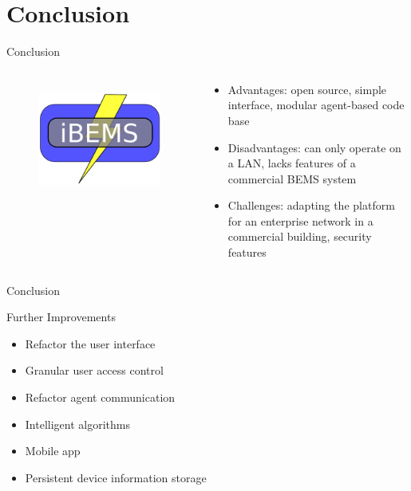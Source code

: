 \documentclass{beamer}
\begin{document}
\section{Conclusion}
\begin{frame}{Conclusion}{} %
  \begin{columns}
    \begin{figure}
      \centering
      \includegraphics[scale=0.8]{figs/logo.pdf}
      \label{fig:logo}
    \end{figure}
    \begin{block}{}
      \begin{itemize}
      \item Advantages: open source, simple interface, modular agent-based code base
      \item Disadvantages: can only operate on a LAN, lacks features of a commercial BEMS system
      \item Challenges: adapting the platform for an enterprise network in a commercial building, security features 
    \end{itemize}
    \end{block}
  \end{columns}  
\end{frame}

\begin{frame}{Conclusion}{}
  \begin{block}{Further Improvements}
    \begin{itemize}
    \item Refactor the user interface
    \item Granular user access control
    \item Refactor agent communication
    \item Intelligent algorithms
    \item Mobile app
    \item Persistent device information storage
    \end{itemize}
  \end{block}
\end{frame}
\end{document}
